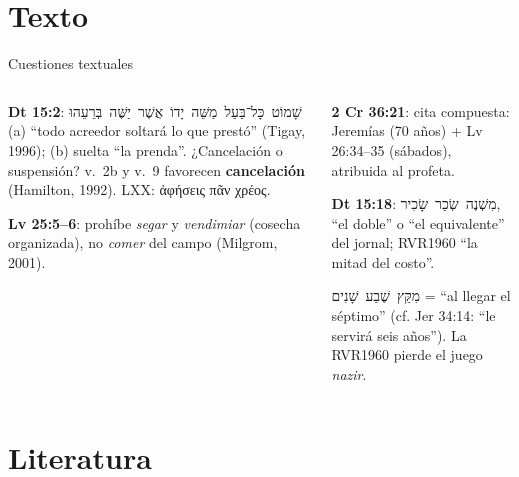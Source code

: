 \documentclass[hyperref={bookmarks=false},aspectratio=169]{beamer}
\newcommand{\heb}[1]{\mbox{\foreignlanguage{hebrew}{#1}}}
\newcommand{\grc}[1]{\foreignlanguage{ancientgreek}{#1}}
\newcommand{\destacar}[1]{\textbf{\textcolor{tierraroja}{#1}}}
\begin{document}
\section{Texto}

\begin{frame}{Cuestiones textuales}
\begin{columns}[t,onlytextwidth]
\begin{column}{0.49\textwidth}\scriptsize
\textbf{\color{tierraroja}Dt 15:2}: \heb{שָׁמוֹט כָּל־בַּעַל מַשֵּׁה יָדוֹ אֲשֶׁר יַשֶּׁה בְּרֵעֵהוּ}\\
(a) ``todo acreedor soltará lo que prestó'' (Tigay, 1996); (b) suelta ``la prenda''. ¿Cancelación o suspensión? v.~2b y v.~9 favorecen \destacar{cancelación} (Hamilton, 1992). LXX: \grc{ἀφήσεις πᾶν χρέος}.\par\medskip
\textbf{\color{tierraroja}Lv 25:5--6}: prohíbe \emph{segar} y \emph{vendimiar} (cosecha organizada), no \emph{comer} del campo (Milgrom, 2001).
\end{column}
\begin{column}{0.49\textwidth}\scriptsize
\textbf{\color{tierraroja}2 Cr 36:21}: cita compuesta: Jeremías (70 años) + Lv 26:34--35 (sábados), atribuida al profeta.\par\medskip
\textbf{\color{tierraroja}Dt 15:18}: \heb{מִשְׁנֶה שְׂכַר שָׂכִיר}, ``el doble'' o ``el equivalente'' del jornal; RVR1960 ``la mitad del costo''.\par\medskip
\begin{tcolorbox}[colback=mostaza!12,colframe=mostaza!85!tierraroja,boxrule=0.6pt,arc=2pt,left=3pt,right=3pt,top=2pt,bottom=2pt,title=Precisión textual,fonttitle=\bfseries\scriptsize,coltitle=caferojizo,colbacktitle=mostaza!30]
\heb{מִקֵּץ שֶׁבַע שָׁנִים} = ``al llegar el séptimo'' (cf. Jer 34:14: ``le servirá seis años''). La RVR1960 pierde el juego \emph{nazir}.
\end{tcolorbox}
\end{column}
\end{columns}
\end{frame}

\section{Literatura}
\end{document}
